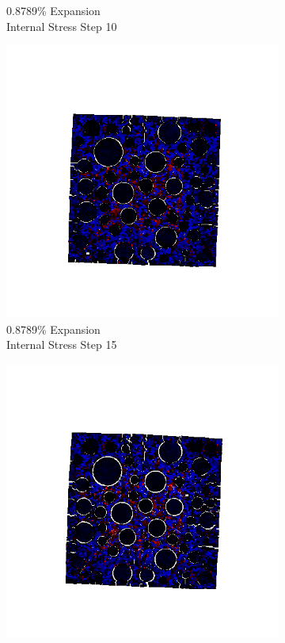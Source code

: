 \begin{figure}[h!]
\begin{subfigure}{.25\textwidth}
      \caption{0.8789\% Expansion\\Internal Stress Step 10}
    \end{subfigure}%
    \begin{subfigure}{.25\textwidth}
      \centering
      \includegraphics[width=1.0\linewidth]{Files/exp_3D/DEF/A30X0C_4_s15.png}
      \caption{0.8789\% Expansion\\Internal Stress Step 15}
    \end{subfigure}%
    \begin{subfigure}{.25\textwidth}
      \centering
      \includegraphics[width=1.0\linewidth]{Files/exp_3D/DEF/A30X0C_4_stress.png}

\end{subfigure}
\end{figure}
